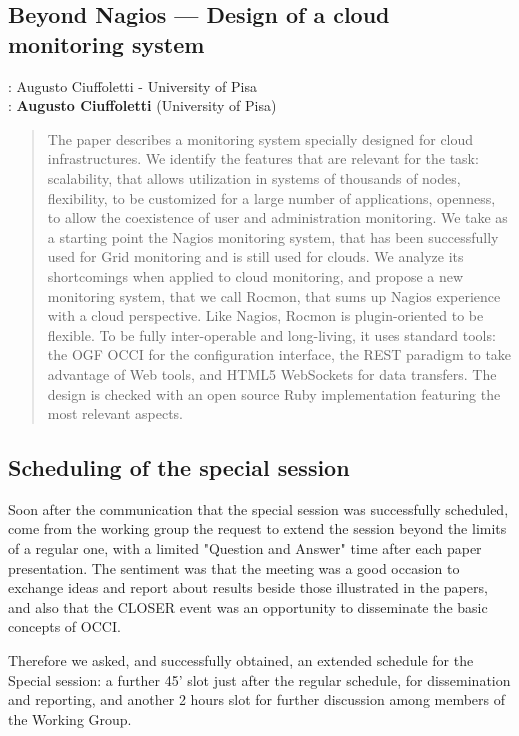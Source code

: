\documentclass[10pt,a4paper]{article}
\begin{document}
\subsection*{Beyond Nagios --- Design of a cloud monitoring system \cite{ciu16a}}

: Augusto Ciuffoletti - University of Pisa\\
: {\bf Augusto Ciuffoletti} (University of Pisa)

\begin{quote}
	The paper describes a monitoring system specially designed for cloud infrastructures. We identify the features
	that are relevant for the task: scalability, that allows utilization in systems of thousands of nodes, flexibility, to
	be customized for a large number of applications, openness, to allow the coexistence of user and administration
	monitoring. We take as a starting point the Nagios monitoring system, that has been successfully used for
	Grid monitoring and is still used for clouds. We analyze its shortcomings when applied to cloud monitoring,
	and propose a new monitoring system, that we call Rocmon, that sums up Nagios experience with a cloud
	perspective. Like Nagios, Rocmon is plugin-oriented to be flexible. To be fully inter-operable and long-living,
	it uses standard tools: the OGF OCCI for the configuration interface, the REST paradigm to take advantage
	of Web tools, and HTML5 WebSockets for data transfers. The design is checked with an open source Ruby
	implementation featuring the most relevant aspects.
\end{quote}


\subsection*{Scheduling of the special session}

Soon after the communication that the special session was successfully scheduled, come from the working group the request to extend the session beyond the limits of a regular one, with a limited "Question and Answer" time after each paper presentation. The sentiment was that the meeting was a good occasion to exchange ideas and report about results beside those illustrated in the papers, and also that the CLOSER event was an opportunity to disseminate the basic concepts of OCCI.

Therefore we asked, and successfully obtained, an extended schedule for the Special session: a further 45' slot just after the regular schedule, for dissemination and reporting, and another 2 hours slot for further discussion among members of the Working Group.
\end{document}
